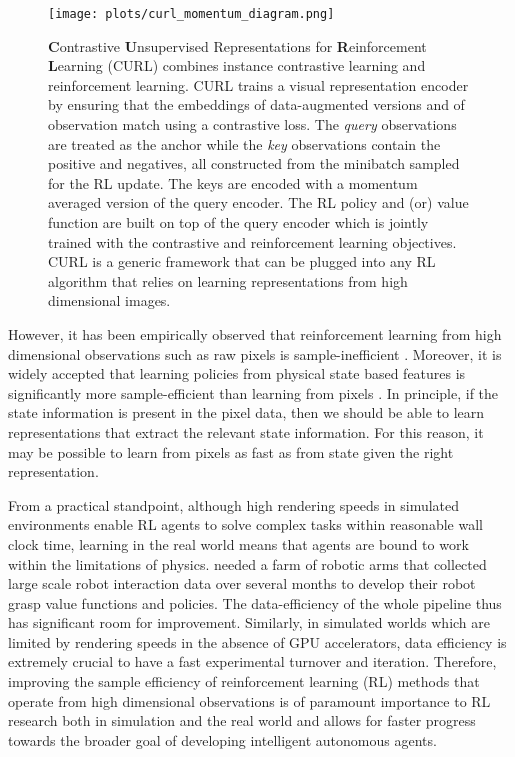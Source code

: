 \documentclass{article}
\begin{document}
\begin{figure}[!ht]
\vskip 0.2in
\begin{center}
\centerline{\texttt{[image: plots/curl\_momentum\_diagram.png]}}

\caption{\textbf{C}ontrastive \textbf{U}nsupervised Representations for \textbf{R}einforcement \textbf{L}earning (CURL) combines instance contrastive learning and reinforcement learning. CURL trains a visual representation encoder by ensuring that the embeddings of data-augmented versions  and  of observation  match using a contrastive loss. The \emph{query} observations  are treated as the anchor while the \emph{key} observations  contain the positive and negatives, all constructed from the minibatch sampled for the RL update. The keys are encoded with a momentum averaged version of the query encoder. The RL policy and (or) value function are built on top of the query encoder which is jointly trained with the contrastive and reinforcement learning objectives. CURL is a generic framework that can be plugged into any RL algorithm that relies on learning representations from high dimensional images.}



\label{momentum_encoder}
\end{center}
\vskip -0.2in
\end{figure}


However, it has been empirically observed that reinforcement learning from high dimensional observations such as raw pixels is sample-inefficient \cite{lake2017building, kaiser2019model}. Moreover, it is widely accepted that learning policies from physical state based features is significantly more sample-efficient than learning from pixels \cite{tassa2018deepmind}. In principle, if the state information is present in the pixel data, then we should be able to learn representations that extract the relevant state information. For this reason, it may be possible to learn from pixels as fast as from state given the right representation.

From a practical standpoint, although high rendering speeds in simulated environments enable RL agents to solve complex tasks within reasonable wall clock time, learning in the real world means that agents are bound to work within the limitations of physics. \citet{kalashnikov2018qt} needed a farm of robotic arms that collected large scale robot interaction data over several months to develop their robot grasp value functions and policies. The data-efficiency of the whole pipeline thus has significant room for improvement. Similarly, in simulated worlds which are limited by rendering speeds in the absence of GPU accelerators, data efficiency is extremely crucial to have a fast experimental turnover and iteration. Therefore, improving the sample efficiency of reinforcement learning (RL) methods that operate from high dimensional observations is of paramount importance to RL research both in simulation and the real world and allows for faster progress towards the broader goal of developing intelligent autonomous agents.
\end{document}
